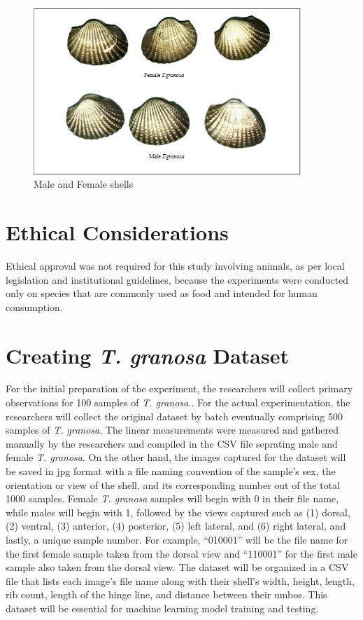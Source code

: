 \begin{figure}[!htbp]
	\centering
	\includegraphics[width=0.9\textwidth]{figures/male-female T.granosa.png}
	\caption{Male and Female \Tegillarcagranosa shells}
\end{figure}

\section{Ethical Considerations}
\label{sec:ethical}

Ethical approval was not required for this study involving animals, as per local legislation and institutional guidelines, because the experiments were conducted only on species that are commonly used as food and intended for human consumption. 


\section{Creating \textit{T. granosa} Dataset}
\label{sec:dataset}

For the initial preparation of the experiment, the researchers will collect primary observations for 100 samples of \textit{T. granosa.}. For the actual experimentation, the researchers will collect the original dataset by batch eventually comprising 500 samples of \textit{T. granosa}. The linear measurements were measured and gathered manually by the researchers and compiled in the CSV file seprating male and female \textit{T. granosa}. On the other hand, the images captured for the dataset will be saved in jpg format with a file naming convention of the sample’s sex, the orientation or view of the shell, and its corresponding number out of the total 1000 samples. Female \textit{T. granosa} samples will begin with 0 in their file name, while males will begin with 1, followed by the views captured such as (1) dorsal, (2) ventral, (3) anterior, (4) posterior, (5) left lateral, and (6) right lateral, and lastly, a unique sample number. For example, “010001” will be the file name for the first female sample taken from the dorsal view and “110001” for the first male sample also taken from the dorsal view. The dataset will be organized in a CSV file that lists each image’s file name along with their shell’s width, height, length, rib count, length of the hinge line, and distance between their umbos. This dataset will be essential for machine learning model training and testing. 

